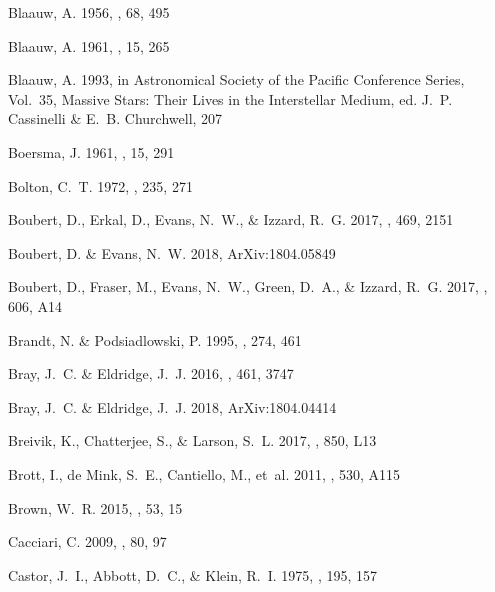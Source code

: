 \documentclass{aa}
\begin{document}
\begin{thebibliography}{242}
{Blaauw}, A. 1956, \pasp, 68, 495

{Blaauw}, A. 1961, \bain, 15, 265

{Blaauw}, A. 1993, in Astronomical Society of the Pacific Conference Series,
  Vol.~35, Massive Stars: Their Lives in the Interstellar Medium, ed. J.~P.
  {Cassinelli} \& E.~B. {Churchwell}, 207

{Boersma}, J. 1961, \bain, 15, 291

{Bolton}, C.~T. 1972, \nat, 235, 271

{Boubert}, D., {Erkal}, D., {Evans}, N.~W., \& {Izzard}, R.~G.
  2017{}, \mnras, 469, 2151

{Boubert}, D. \& {Evans}, N.~W. 2018, ArXiv:1804.05849

{Boubert}, D., {Fraser}, M., {Evans}, N.~W., {Green}, D.~A., \& {Izzard}, R.~G.
  2017{}, \aap, 606, A14

{Brandt}, N. \& {Podsiadlowski}, P. 1995, \mnras, 274, 461

{Bray}, J.~C. \& {Eldridge}, J.~J. 2016, \mnras, 461, 3747

{Bray}, J.~C. \& {Eldridge}, J.~J. 2018, ArXiv:1804.04414

{Breivik}, K., {Chatterjee}, S., \& {Larson}, S.~L. 2017, \apjl, 850, L13

{Brott}, I., {de Mink}, S.~E., {Cantiello}, M., {et~al.} 2011, \aap, 530, A115

{Brown}, W.~R. 2015, \araa, 53, 15

{Cacciari}, C. 2009, \memsai, 80, 97

{Castor}, J.~I., {Abbott}, D.~C., \& {Klein}, R.~I. 1975, \apj, 195, 157


\end{thebibliography}
\end{document}
